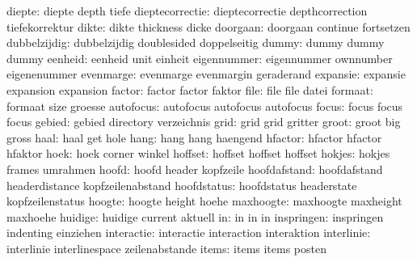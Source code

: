               diepte:  diepte               depth                tiefe
     dieptecorrectie:  dieptecorrectie      depthcorrection      tiefekorrektur
               dikte:  dikte                thickness            dicke
            doorgaan:  doorgaan             continue             fortsetzen
        dubbelzijdig:  dubbelzijdig         doublesided          doppelseitig
               dummy:  dummy                dummy                dummy
             eenheid:  eenheid              unit                 einheit
         eigennummer:  eigennummer          ownnumber            eigenenummer
           evenmarge:  evenmarge            evenmargin           geraderand
            expansie:  expansie             expansion            expansion
              factor:  factor               factor               faktor
                file:  file                 file                 datei
             formaat:  formaat              size                 groesse
           autofocus:  autofocus            autofocus            autofocus 
               focus:  focus                focus                focus 
              gebied:  gebied               directory            verzeichnis
                grid:  grid                 grid                 gritter
               groot:  groot                big                  gross
                haal:  haal                 get                  hole
                hang:  hang                 hang                 haengend
             hfactor:  hfactor              hfactor              hfaktor
                hoek:  hoek                 corner               winkel
             hoffset:  hoffset              hoffset              hoffset
              hokjes:  hokjes               frames               umrahmen
               hoofd:  hoofd                header               kopfzeile
        hoofdafstand:  hoofdafstand         headerdistance       kopfzeilenabstand
         hoofdstatus:  hoofdstatus          headerstate          kopfzeilenstatus
              hoogte:  hoogte               height               hoehe
           maxhoogte:  maxhoogte            maxheight            maxhoehe
             huidige:  huidige              current              aktuell
                  in:  in                   in                   in
          inspringen:  inspringen           indenting            einziehen
          interactie:  interactie           interaction          interaktion
          interlinie:  interlinie           interlinespace       zeilenabstande
               items:  items                items                posten
